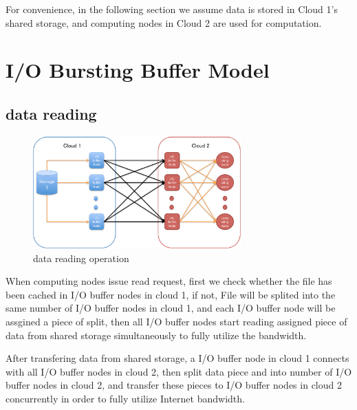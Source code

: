 \documentclass[JIP,draft]{ipsj}
\begin{document}
For convenience, in the following section we assume data is stored in Cloud 1's shared storage, and computing nodes in Cloud 2 are used for computation. 

\section{I/O Bursting Buffer Model}

\subsection{data reading}

\begin{figure}[tb]
	\centering
	\includegraphics[width=8cm]{reading}
	\caption{data reading operation}
	\label{reading}
\end{figure}

When computing nodes issue read request, first we check whether the file has been cached in I/O buffer nodes in cloud 1, if not, File will be splited into the same number of I/O buffer nodes in cloud 1, and each I/O buffer node will be assgined a piece of split, then all I/O buffer nodes start reading assigned piece of data from shared storage simultaneously to fully utilize the bandwidth.

After transfering data from shared storage, a I/O buffer node in cloud 1 connects with all I/O buffer nodes in cloud 2, then split data piece and into number of I/O buffer nodes in cloud 2, and transfer these pieces to I/O buffer nodes in cloud 2 concurrently in order to fully utilize Internet bandwidth.
\end{document}
